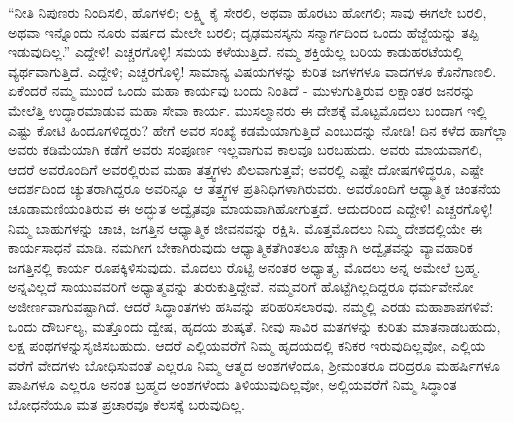 “ನೀತಿ ನಿಪುಣರು ನಿಂದಿಸಲಿ, ಹೊಗಳಲಿ; ಲಕ್ಷ್ಮಿ ಕೈ ಸೇರಲಿ, ಅಥವಾ ಹೊರಟು ಹೋಗಲಿ; ಸಾವು ಈಗಲೇ ಬರಲಿ, ಅಥವಾ ಇನ್ನೊಂದು ನೂರು ವರ್ಷದ ಮೇಲೇ ಬರಲಿ; ದೃಢಮನಸ್ಕನು ಸನ್ಮಾರ್ಗದಿಂದ ಒಂದು ಹೆಜ್ಜೆಯನ್ನು ತಪ್ಪಿ ಇಡುವುದಿಲ್ಲ.” ಎದ್ದೇಳಿ! ಎಚ್ಚರಗೊಳ್ಳಿ! ಸಮಯ ಕಳೆಯುತ್ತಿದೆ. ನಮ್ಮ ಶಕ್ತಿಯೆಲ್ಲ ಬರಿಯ ಕಾಡುಹರಟೆಯಲ್ಲಿ ವ್ಯರ್ಥವಾಗುತ್ತಿದೆ. ಎದ್ದೇಳಿ; ಎಚ್ಚರಗೊಳ್ಳಿ! ಸಾಮಾನ್ಯ ವಿಷಯಗಳನ್ನು ಕುರಿತ ಜಗಳಗಳೂ ವಾದಗಳೂ ಕೊನೆಗಾಣಲಿ. ಏಕೆಂದರೆ ನಮ್ಮ ಮುಂದೆ ಒಂದು ಮಹಾ ಕಾರ್ಯವು ಬಂದು ನಿಂತಿದೆ - ಮುಳುಗುತ್ತಿರುವ ಲಕ್ಷಾಂತರ ಜನರನ್ನು ಮೇಲೆತ್ತಿ ಉದ್ಧಾರಮಾಡುವ ಮಹಾ ಸೇವಾ ಕಾರ್ಯ. ಮುಸಲ್ಮಾನರು ಈ ದೇಶಕ್ಕೆ ಮೊಟ್ಟಮೊದಲು ಬಂದಾಗ ಇಲ್ಲಿ ಎಷ್ಟು ಕೋಟಿ ಹಿಂದೂಗಳಿದ್ದರು? ಹೇಗೆ ಅವರ ಸಂಖ್ಯೆ ಕಡಮೆಯಾಗುತ್ತಿದೆ ಎಂಬುದನ್ನು ನೋಡಿ! ದಿನ ಕಳೆದ ಹಾಗೆಲ್ಲಾ ಅವರು ಕಡಿಮೆಯಾಗಿ ಕಡೆಗೆ ಅವರು ಸಂಪೂರ್ಣ ಇಲ್ಲವಾಗುವ ಕಾಲವೂ ಬರಬಹುದು. ಅವರು ಮಾಯವಾಗಲಿ, ಆದರೆ ಅವರೊಂದಿಗೆ ಅವರಲ್ಲಿರುವ ಮಹಾ ತತ್ತ್ವಗಳು ಖಿಲವಾಗುತ್ತವೆ; ಅವರಲ್ಲಿ ಎಷ್ಟೇ ದೋಷಗಳಿದ್ಧರೂ, ಎಷ್ಟೇ ಆದರ್ಶದಿಂದ ಚ್ಯುತರಾಗಿದ್ದರೂ ಅವರಿನ್ನೂ ಆ ತತ್ತ್ವಗಳ ಪ್ರತಿನಿಧಿಗಳಾಗಿರುವರು. ಅವರೊಂದಿಗೆ ಆಧ್ಯಾತ್ಮಿಕ ಚಿಂತನೆಯ ಚೂಡಾಮಣಿಯಂತಿರುವ ಈ ಅದ್ಭುತ ಅದ್ವೈತವೂ ಮಾಯವಾಗಿಹೋಗುತ್ತದೆ. ಆದುದರಿಂದ ಎದ್ದೇಳಿ! ಎಚ್ಚರಗೊಳ್ಳಿ! ನಿಮ್ಮ ಬಾಹುಗಳನ್ನು ಚಾಚಿ, ಜಗತ್ತಿನ ಆಧ್ಯಾತ್ಮಿಕ ಜೀವನವನ್ನು ರಕ್ಷಿಸಿ. ಮೊತ್ತಮೊದಲು ನಿಮ್ಮ ದೇಶದಲ್ಲಿಯೇ ಈ ಕಾರ್ಯಸಾಧನೆ ಮಾಡಿ. ನಮಗೀಗ ಬೇಕಾಗಿರುವುದು ಆಧ್ಯಾತ್ಮಿಕತೆಗಿಂತಲೂ ಹೆಚ್ಚಾಗಿ ಅದ್ವೈತವನ್ನು ವ್ಯಾವಹಾರಿಕ ಜಗತ್ತಿನಲ್ಲಿ ಕಾರ್ಯ ರೂಪಕ್ಕಿಳಿಸುವುದು. ಮೊದಲು ರೊಟ್ಟಿ ಅನಂತರ ಅಧ್ಯಾತ್ಮ, ಮೊದಲು ಅನ್ನ ಅಮೇಲೆ ಬ್ರಹ್ಮ. ಅನ್ನವಿಲ್ಲದೆ ಸಾಯುವವರಿಗೆ ಅಧ್ಯಾತ್ಮವನ್ನು ತುರುಕುತ್ತಿದ್ದೇವೆ. ನಮ್ಮವರಿಗೆ ಹೊಟ್ಟೆಗಿಲ್ಲದಿದ್ದರೂ ಧರ್ಮವೇನೋ ಅಜೀರ್ಣವಾಗುವಷ್ಟಾಗಿದೆ. ಆದರೆ ಸಿದ್ಧಾಂತಗಳು ಹಸಿವನ್ನು ಪರಿಹರಿಸಲಾರವು. ನಮ್ಮಲ್ಲಿ ಎರಡು ಮಹಾಶಾಪಗಳಿವೆ: ಒಂದು ದೌರ್ಬಲ್ಯ, ಮತ್ತೊಂದು ದ್ವೇಷ, ಹೃದಯ ಶುಷ್ಕತೆ. ನೀವು ಸಾವಿರ ಮತಗಳನ್ನು ಕುರಿತು ಮಾತನಾಡಬಹುದು, ಲಕ್ಷ ಪಂಥಗಳನ್ನು\break ಸೃಜಿಸಬಹುದು. ಆದರೆ ಎಲ್ಲಿಯವರೆಗೆ ನಿಮ್ಮ ಹೃದಯದಲ್ಲಿ ಕನಿಕರ ಇರುವು\-ದಿಲ್ಲವೋ, ಎಲ್ಲಿಯ ವರೆಗೆ ವೇದಗಳು ಬೋಧಿಸುವಂತೆ ಎಲ್ಲರೂ ನಿಮ್ಮ ಆತ್ಮದ ಅಂಶಗಳೆಂದೂ, ಶ‍್ರೀಮಂತರೂ ದರಿದ್ರರೂ ಮಹರ್ಷಿಗಳೂ ಪಾಪಿಗಳೂ ಎಲ್ಲರೂ ಅನಂತ ಬ್ರಹ್ಮದ ಅಂಶಗಳೆಂದು ತಿಳಿಯುವುದಿಲ್ಲವೋ, ಅಲ್ಲಿಯವರೆಗೆ ನಿಮ್ಮ ಸಿದ್ಧಾಂತ ಬೋಧನೆಯೂ ಮತ ಪ್ರಚಾರವೂ ಕೆಲಸಕ್ಕೆ ಬರುವುದಿಲ್ಲ.


